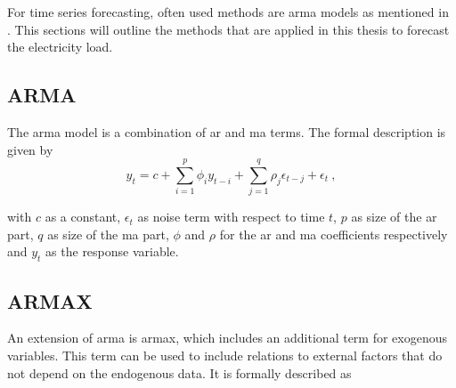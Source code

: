 For time series forecasting, often used methods are \eg \gls{arma} models as mentioned in . This sections will outline the methods that are applied in this thesis to forecast the electricity load.\\%

\subsection*{ARMA}

The \gls{arma} model is a combination of \acrfull{ar} and \acrfull{ma} terms. The formal description is given by\\

\begin{equation}
y_t = c+\sum_{i=1}^{p}\phi_iy_{t-i}+\sum_{j=1}^{q}\rho_j\epsilon_{t-j}+\epsilon_t~,
\label{eq:arma}
\end{equation}

with $c$ as a constant, $\epsilon_t$ as noise term with respect to time $t$, $p$ as size of the \gls{ar} part, $q$ as size of the \gls{ma} part, $\phi$ and $\rho$ for the \gls{ar} and \gls{ma} coefficients respectively and $y_t$ as the response variable.\\

\subsection*{ARMAX}

An extension of \gls{arma} is \gls{armax}, which includes an additional term for exogenous variables. This term can be used to include relations to external factors that do not depend on the endogenous data. It is formally described as\\

